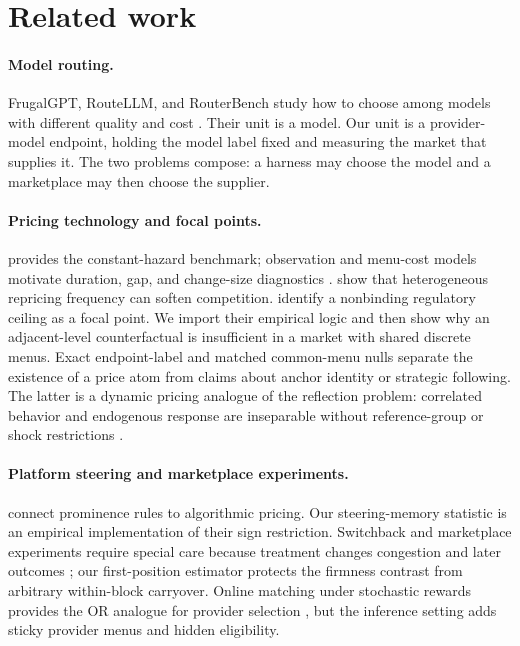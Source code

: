\documentclass[11pt]{article}
\newcommand{\1}{\mathbf{1}}
\begin{document}
\section{Related work}
\label{sec:related}

\paragraph{Model routing.}
FrugalGPT, RouteLLM, and RouterBench study how to choose among models with different
quality and cost \cite{chen2023frugalgpt,ong2024routellm,hu2024routerbench}.  Their
unit is a model.  Our unit is a provider-model endpoint, holding the model label
fixed and measuring the market that supplies it.  The two problems compose: a
harness may choose the model and a marketplace may then choose the supplier.

\paragraph{Pricing technology and focal points.}
\citet{calvo1983} provides the constant-hazard benchmark; observation and
menu-cost models motivate duration, gap, and change-size diagnostics
\citep{alvarezlippipaciello2011,alvarezlebihanlippi2016}.
\citet{brownmackay2023} show that heterogeneous repricing frequency can soften
competition.  \citet{knittelstango2003} identify a nonbinding
regulatory ceiling as a focal point.  We import their empirical logic and then
show why an adjacent-level counterfactual is insufficient in a market with shared
discrete menus.  Exact endpoint-label and matched common-menu nulls separate the
existence of a price atom from claims about anchor identity or strategic following.
The latter is a dynamic pricing analogue of the reflection problem: correlated
behavior and endogenous response are inseparable without reference-group or shock
restrictions \citep{manski1993}.

\paragraph{Platform steering and marketplace experiments.}
\citet{johnsonrhodeswildenbeest2023} connect
prominence rules to algorithmic pricing.  Our steering-memory statistic is an
empirical implementation of their sign restriction.  Switchback and marketplace
experiments require special care because treatment changes congestion and later
outcomes \cite{bojinov2023,holtz2025}; our first-position estimator protects the
firmness contrast from arbitrary within-block carryover.  Online matching under
stochastic rewards provides the OR analogue for provider selection
\cite{brubach2025}, but the inference setting adds sticky provider menus and hidden
eligibility.
\end{document}
